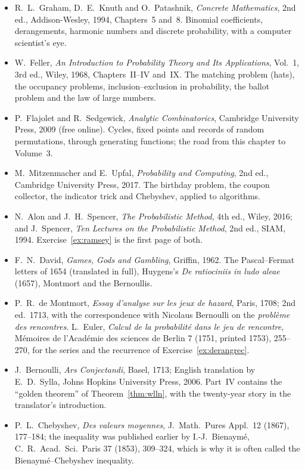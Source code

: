 \begin{itemize}\raggedright
\item R.~L.~Graham, D.~E.~Knuth and O.~Patashnik, \emph{Concrete Mathematics}, 2nd ed., Addison-Wesley, 1994, Chapters~5 and~8. Binomial coefficients, derangements, harmonic numbers and discrete probability, with a computer scientist's eye.
\item W.~Feller, \emph{An Introduction to Probability Theory and Its Applications}, Vol.~1, 3rd ed., Wiley, 1968, Chapters~II--IV and~IX. The matching problem (hats), the occupancy problems, inclusion--exclusion in probability, the ballot problem and the law of large numbers.
\item P.~Flajolet and R.~Sedgewick, \emph{Analytic Combinatorics}, Cambridge University Press, 2009 (free online). Cycles, fixed points and records of random permutations, through generating functions; the road from this chapter to Volume~3.
\item M.~Mitzenmacher and E.~Upfal, \emph{Probability and Computing}, 2nd ed., Cambridge University Press, 2017. The birthday problem, the coupon collector, the indicator trick and Chebyshev, applied to algorithms.
\item N.~Alon and J.~H.~Spencer, \emph{The Probabilistic Method}, 4th ed., Wiley, 2016; and J.~Spencer, \emph{Ten Lectures on the Probabilistic Method}, 2nd ed., SIAM, 1994. Exercise~\ref{ex:ramsey} is the first page of both.
\item F.~N.~David, \emph{Games, Gods and Gambling}, Griffin, 1962. The Pascal--Fermat letters of 1654 (translated in full), Huygens's \emph{De ratiociniis in ludo aleae} (1657), Montmort and the Bernoullis.
\item P.~R.~de Montmort, \emph{Essay d'analyse sur les jeux de hazard}, Paris, 1708; 2nd ed.\ 1713, with the correspondence with Nicolaus Bernoulli on the \emph{probl\`eme des rencontres}. L.~Euler, \emph{Calcul de la probabilit\'e dans le jeu de rencontre}, M\'emoires de l'Acad\'emie des sciences de Berlin 7 (1751, printed 1753), 255--270, for the series and the recurrence of Exercise~\ref{ex:derangrec}.
\item J.~Bernoulli, \emph{Ars Conjectandi}, Basel, 1713; English translation by E.~D.~Sylla, Johns Hopkins University Press, 2006. Part~IV contains the ``golden theorem'' of Theorem~\ref{thm:wlln}, with the twenty-year story in the translator's introduction.
\item P.~L.~Chebyshev, \emph{Des valeurs moyennes}, J.\ Math.\ Pures Appl.\ 12 (1867), 177--184; the inequality was published earlier by I.-J.~Bienaym\'e, C.\ R.\ Acad.\ Sci.\ Paris 37 (1853), 309--324, which is why it is often called the Bienaym\'e--Chebyshev inequality.

\end{itemize}
